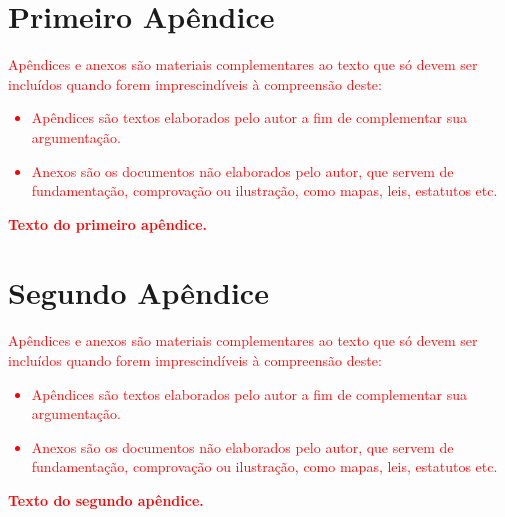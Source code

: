 \begin{apendicesenv}

\chapter{Primeiro Apêndice}

\textcolor{red}{Apêndices e anexos são materiais complementares ao texto que só devem ser incluídos quando forem imprescindíveis à compreensão deste:}



\textcolor{red}{
\begin{itemize}
    \item Apêndices são textos elaborados pelo autor a fim de complementar sua argumentação.
    \item Anexos são os documentos não elaborados pelo autor, que servem de fundamentação, comprovação ou ilustração, como mapas, leis, estatutos etc.
\end{itemize}}

\textcolor{red}{\textbf{Texto do primeiro apêndice.}}

\chapter{Segundo Apêndice}
\textcolor{red}{Apêndices e anexos são materiais complementares ao texto que só devem ser incluídos quando forem imprescindíveis à compreensão deste:}

\textcolor{red}{
\begin{itemize}
    \item Apêndices são textos elaborados pelo autor a fim de complementar sua argumentação.
    \item Anexos são os documentos não elaborados pelo autor, que servem de fundamentação, comprovação ou ilustração, como mapas, leis, estatutos etc.
\end{itemize}}

\textcolor{red}{\textbf{Texto do segundo apêndice.}}

\end{apendicesenv}